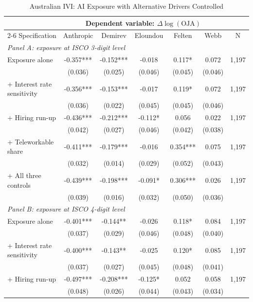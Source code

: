 \documentclass[11pt]{article}
\begin{document}
\begin{table}[H]
\centering
\footnotesize
\setlength{\tabcolsep}{4pt}
\caption{Australian IVI: AI Exposure with Alternative Drivers Controlled}
\begin{tabular}{lcccccc}
\hline\hline
 & \multicolumn{5}{c}{Dependent variable: $\Delta \log(\text{OJA})$} & \\
\cmidrule(lr){2-6}
Specification & Anthropic & Demirev & Eloundou & Felten & Webb & N \\
\midrule
\multicolumn{7}{l}{\textit{Panel A: exposure at ISCO 3-digit level}} \\
Exposure alone & -0.357*** & -0.152*** & -0.018 & 0.117* & 0.072 & 1,197 \\
 & (0.036) & (0.025) & (0.046) & (0.045) & (0.046) & \\
+ Interest rate sensitivity & -0.356*** & -0.153*** & -0.017 & 0.119* & 0.072 & 1,197 \\
 & (0.036) & (0.022) & (0.045) & (0.045) & (0.046) & \\
+ Hiring run-up & -0.436*** & -0.212*** & -0.112* & 0.056 & 0.022 & 1,197 \\
 & (0.042) & (0.027) & (0.046) & (0.042) & (0.038) & \\
+ Teleworkable share & -0.411*** & -0.179*** & -0.016 & 0.354*** & 0.075 & 1,197 \\
 & (0.032) & (0.014) & (0.029) & (0.052) & (0.043) & \\
+ All three controls & -0.439*** & -0.198*** & -0.091* & 0.306*** & 0.026 & 1,197 \\
 & (0.039) & (0.016) & (0.032) & (0.050) & (0.036) & \\
\midrule
\multicolumn{7}{l}{\textit{Panel B: exposure at ISCO 4-digit level}} \\
Exposure alone & -0.401*** & -0.144** & -0.026 & 0.118* & 0.084 & 1,197 \\
 & (0.037) & (0.029) & (0.046) & (0.048) & (0.040) & \\
+ Interest rate sensitivity & -0.400*** & -0.143** & -0.025 & 0.120* & 0.085 & 1,197 \\
 & (0.037) & (0.027) & (0.045) & (0.048) & (0.041) & \\
+ Hiring run-up & -0.497*** & -0.208*** & -0.125* & 0.052 & 0.058 & 1,197 \\
 & (0.048) & (0.026) & (0.044) & (0.043) & (0.034) & \\

\end{tabular}
\end{table}
\end{document}
